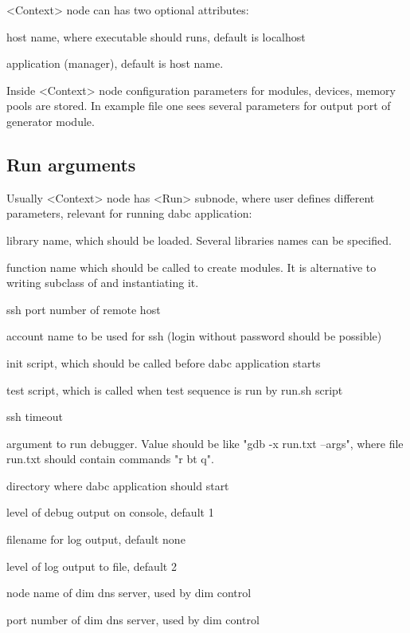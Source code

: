 <Context> node can has two optional attributes:
\bdes
\item["host"] host name, where executable should runs, default is localhost
\item["name"] application (manager), default is host name.
\edes

Inside <Context> node configuration parameters for modules, devices, memory pools are stored.
In example file one sees several parameters for output port of generator module.  


\subsection{Run arguments}

Usually <Context> node has <Run> subnode, where user defines different parameters, 
relevant for running dabc application:

\bdes
\item[lib] library name, which should be loaded. Several libraries names can be specified.
\item[func] function name which should be called to create modules. 
It is alternative to writing subclass of  and instantiating it.
\item[port] ssh port number of remote host
\item[user] account name to be used for ssh (login without password should be possible)
\item[init] init script, which should be called before dabc application starts
\item[test] test script, which is called when test sequence is run by run.sh script
\item[timeout] ssh timeout 
\item[debugger] argument to run debugger. Value should be like "gdb -x run.txt --args", where file run.txt should contain commands "r bt q".
\item[workdir] directory where dabc application should start
\item[debuglevel] level of debug output on console, default 1
\item[logfile] filename for log output, default none  
\item[loglevel] level of log output to file, default 2 
\item[DIM\_DNS\_NODE] node name of dim dns server, used by dim control 
\item[DIM\_DNS\_PORT] port number of dim dns server, used by dim control 
\edes


